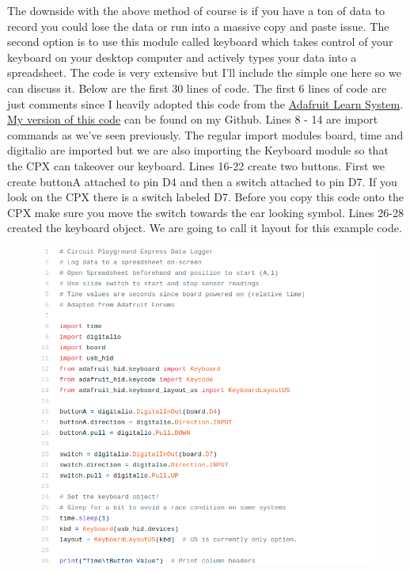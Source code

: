 The downside with the above method of course is if you have a ton of
data to record you could lose the data or run into a massive copy and
paste issue. The second option is to use this module called keyboard
which takes control of your keyboard on your desktop computer and
actively types your data into a spreadsheet. The code is very
extensive but I’ll include the simple one here so we can discuss
it. Below are the first 30 lines of code. The first 6 lines of code
are just comments since I heavily adopted this code from the \href{https://learn.adafruit.com/make-it-a-keyboard/circuitpython}{Adafruit
Learn System}. \href{https://github.com/cmontalvo251/Microcontrollers/blob/master/Circuit_Playground/CircuitPython/Data_Logging/record_button_presses_typing.py}{My version of this code} can be found on my Github. Lines 8 -
14 are import commands as we’ve seen previously. The regular import
modules board, time and digitalio are imported but we are also
importing the Keyboard module so that the CPX can takeover our
keyboard. Lines 16-22 create two buttons. First we create buttonA
attached to pin D4 and then a switch attached to pin D7. If you look
on the CPX there is a switch labeled D7. Before you copy this code
onto the CPX make sure you move the switch towards the ear looking
symbol. Lines 26-28 created the keyboard object. We are going to call
it layout for this example code.
\begin{figure}[H]
  \begin{center}
    \includegraphics[width=\textwidth]{Figures/Typing1.png}
  \end{center}
\end{figure}
